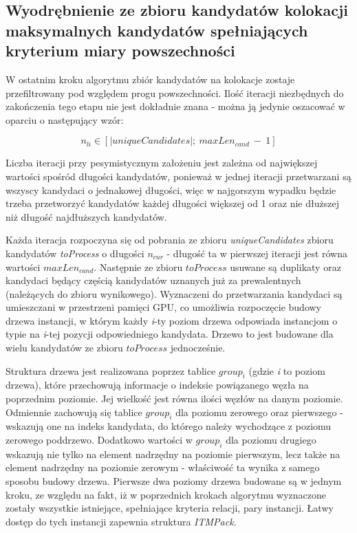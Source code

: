 \documentclass[12pt]{article}
\begin{document}
\subsection{Wyodrębnienie ze zbioru kandydatów kolokacji maksymalnych kandydatów spełniających kryterium miary powszechności}

W ostatnim kroku algorytmu zbiór kandydatów na kolokacje zostaje przefiltrowany pod względem progu powszechności. Ilość iteracji niezbędnych do zakończenia tego etapu nie jest dokładnie znana - można ją jedynie oszacować w oparciu o następujący wzór:

\begin{equation}
n_{li} \in {[ |uniqueCandidates|;\ maxLen_{cand}\ -\ 1 ]}
\end{equation}

Liczba iteracji przy pesymistycznym założeniu jest zależna od największej wartości spośród długości kandydatów, ponieważ w jednej iteracji przetwarzani są wszyscy kandydaci o jednakowej długości, więc w najgorszym wypadku będzie trzeba przetworzyć kandydatów każdej długości większej od 1 oraz nie dłuższej niż długość najdłuższych kandydatów. 

Każda iteracja rozpoczyna się od pobrania ze zbioru \textit{uniqueCandidates} zbioru kandydatów \textit{toProcess} o długości $ n_{cur} $ - długość ta w pierwszej iteracji jest równa wartości $ maxLen_{cand} $. Następnie ze zbioru $ toProcess $ usuwane są duplikaty oraz kandydaci będący częścią kandydatów uznanych już za prewalentnych (należących do zbioru wynikowego). 
Wyznaczeni do przetwarzania kandydaci są umieszczani w przestrzeni pamięci GPU, co umożliwia rozpoczęcie budowy drzewa instancji, w którym każdy \textit{i}-ty poziom drzewa odpowiada instancjom o typie na \textit{i}-tej pozycji odpowiedniego kandydata. Drzewo to jest budowane dla wielu kandydatów ze zbioru $ toProcess $ jednocześnie.

Struktura drzewa jest realizowana poprzez tablice $ group_{i} $ (gdzie \textit{i} to poziom drzewa),   które przechowują informacje o indeksie powiązanego węzła na poprzednim poziomie. Jej wielkość jest równa ilości węzłów na danym poziomie. Odmiennie zachowują się tablice $ group_{i} $ dla poziomu zerowego oraz pierwszego - wskazują one na indeks kandydata, do którego należy wychodzące z poziomu zerowego poddrzewo. Dodatkowo wartości w $ group_{i} $ dla poziomu drugiego wskazują nie tylko na element nadrzędny na poziomie pierwszym, lecz także na element nadrzędny na poziomie zerowym - właściwość ta wynika z samego sposobu budowy drzewa. Pierwsze dwa poziomy drzewa budowane są w jednym kroku, ze względu na fakt, iż w poprzednich krokach algorytmu wyznaczone zostały wszystkie istniejące, spełniające kryteria relacji, pary instancji. Łatwy dostęp do tych instancji zapewnia struktura \textit{ITMPack}. 
\end{document}
